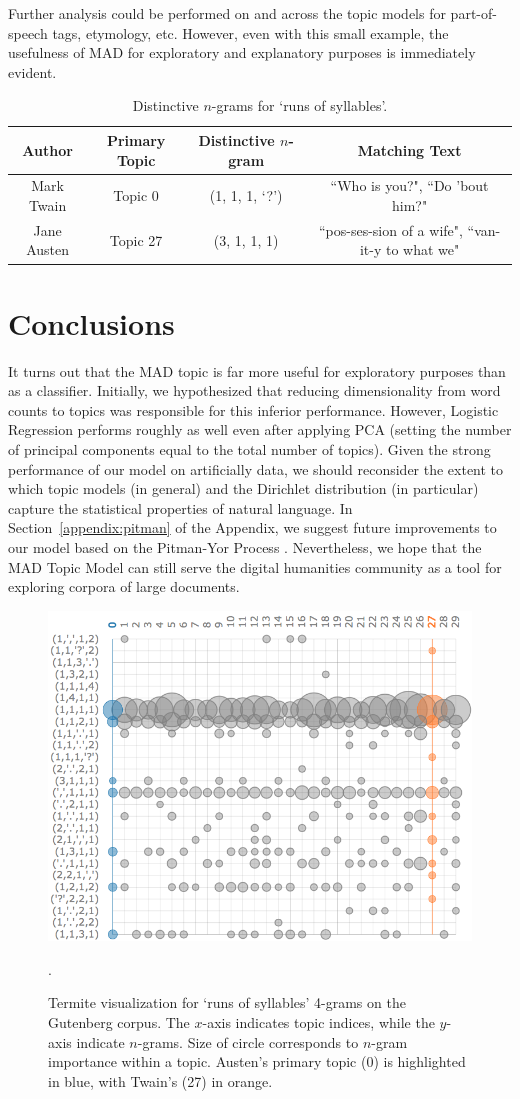 \documentclass[14pt]{article} %
\theoremstyle{plain}
\theoremstyle{definition}
\theoremstyle{remark}
\begin{document}
Further analysis could be performed on and across the topic models for part-of-speech tags, etymology, etc. However, even with this small example, the usefulness of MAD for exploratory and explanatory purposes is immediately evident.

\begin{table}[ht] 
\centering
\begin{tabular}{ c | c | c | c }
  Author & Primary Topic & Distinctive $n$-gram & Matching Text \\
  \hline
  Mark Twain & Topic 0 & (1, 1, 1, `?') & ``Who is you?", ``Do 'bout him?" \\
  Jane Austen & Topic 27 & (3, 1, 1, 1) & ``pos-ses-sion of a wife", ``van-it-y to what we" \\
\end{tabular}
\caption{Distinctive $n$-grams for `runs of syllables'.}
\label{tab:distinctive_ngrams}
\end{table}

\section{Conclusions}
It turns out that the MAD topic is far more useful for exploratory purposes than as a classifier. Initially, we hypothesized that reducing dimensionality from word counts to topics was responsible for this inferior performance. However, Logistic Regression performs roughly as well even after applying PCA (setting the number of principal components equal to the total number of topics). Given the strong performance of our model on artificially data, we should reconsider the extent to which topic models (in general) and the Dirichlet distribution (in particular) capture the statistical properties of natural language. In Section~\ref{appendix:pitman} of the Appendix, we suggest future improvements to our model based on the Pitman-Yor Process \cite{teh2006hierarchical}. Nevertheless, we hope that the MAD Topic Model can still serve the digital humanities community as a tool for exploring corpora of large documents.

\newpage


\begin{figure}
\centering
\includegraphics[width=0.5\linewidth]{termite.png}
\caption{Termite visualization for `runs of syllables' 4-grams on the Gutenberg corpus. The $x$-axis indicates topic indices, while the $y$-axis indicate $n$-grams. Size of circle corresponds to $n$-gram importance within a topic. Austen's primary topic (0) is highlighted in blue, with Twain's (27) in orange.}
\label{fig:termite}.
\end{figure}
\end{document}
